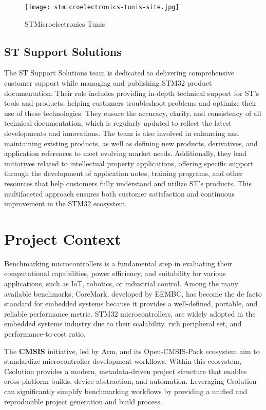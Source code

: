  \begin{figure}[htp]
  \centering
  \texttt{[image: stmicroelectronics-tunis-site.jpg]}
  \caption{STMicroelectronics Tunis}
  \label{fig:st_tn}
\end{figure}


\subsection{ST Support Solutions }
The ST Support Solutions team is dedicated to delivering comprehensive customer support while managing and publishing STM32 product documentation. Their role includes providing in-depth technical support for ST’s tools and products, helping customers troubleshoot problems and optimize their use of these technologies. They ensure the accuracy, clarity, and consistency of all technical documentation, which is regularly updated to reflect the latest developments and innovations. The team is also involved in enhancing and maintaining existing products, as well as defining new products, derivatives, and application references to meet evolving market needs. Additionally, they lead initiatives related to intellectual property applications, offering specific support through the development of application notes, training programs, and other resources that help customers fully understand and utilize ST’s products. This multifaceted approach ensures both customer satisfaction and continuous improvement in the STM32 ecosystem.

\section {Project Context}

Benchmarking microcontrollers is a fundamental step in evaluating their computational capabilities, power efficiency, and suitability for various applications, such as IoT, robotics, or industrial control. Among the many available benchmarks, CoreMark, developed by EEMBC, has become the de facto standard for embedded systems because it provides a well-defined, portable, and reliable performance metric.
STM32 microcontrollers, are widely adopted in the embedded systems industry due to their scalability, rich peripheral set, and performance-to-cost ratio.

The \textbf{CMSIS} initiative, led by Arm, and its Open-CMSIS-Pack ecosystem aim to standardize microcontroller development workflows. Within this ecosystem, Csolution provides a modern, metadata-driven project structure that enables cross-platform builds, device abstraction, and automation. Leveraging Csolution can significantly simplify benchmarking workflows by providing a unified and reproducible project generation and build process.

